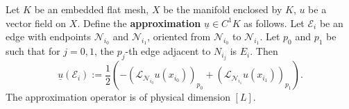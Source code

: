 \begin{definition}
  \label{idec/vector_field_to_1_cochain/definition}
  Let
    $K$ be an embedded flat mesh,
    $X$ be the manifold enclosed by $K$,
    $u$ be a vector field on $X$.
  Define the \textbf{approximation} $\underline{u} \in C^1 K$ as follows.
  Let $\mathcal{E}_i$ be an edge with endpoints $\mathcal{N}_{i_0}$ and
  $\mathcal{N}_{i_1}$, oriented from $\mathcal{N}_{i_0}$ to $\mathcal{N}_{i_1}$.
  Let $p_0$ and $p_1$ be such that for $j = 0, 1$,
  the $p_j$-th edge adjacent to $N_{i_j}$ is $E_i$.
  Then
  \begin{equation}
    \underline{u}(\mathcal{E}_i) :=
      \frac{1}{2}
      ( - (\mathcal{L}_{\mathcal{N}_{i_0}} u(x_{i_0}))_{p_0}
        + (\mathcal{L}_{\mathcal{N}_{i_1}} u(x_{i_1}))_{p_1}
      ).
  \end{equation}
  The approximation operator is of physical dimension $[L]$.
\end{definition}
